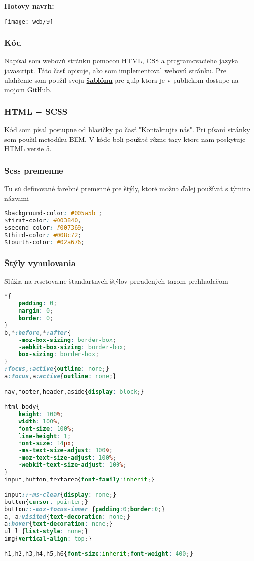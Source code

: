       \newpage

      \begin{center}
        \textbf{Hotovy navrh:}

        \texttt{[image: web/9]}
      \end{center}

      \subsubsection{Kód}
      Napísal som webovú stránku pomocou HTML, CSS a programovacieho jazyka javascript. Táto časť opisuje, ako som implementoval webovú stránku.
      Pre uľahčenie som použil svoju \textbf{\href{https://github.com/SerMeliodas/gulp-template}{šablónu}} pre gulp ktora je v publickom dostupe na mojom GitHub.

      \subsubsection*{HTML + SCSS}

      Kód som písal postupne od hlavičky po časť "Kontaktujte nás". Pri písaní stránky som použil metodiku BEM.
      V kóde boli použité rôzne tagy ktore nam poskytuje HTML versie 5.

      \subsubsection*{Scss premenne}
      Tu sú definované farebné premenné pre štýly, ktoré možno ďalej používať s týmito názvami
      \begin{lstlisting}[language=css]
$background-color: #005a5b ;
$first-color: #003840;
$second-color: #007369;
$third-color: #008c72;
$fourth-color: #02a676;
      \end{lstlisting}

      \subsubsection*{Štýly vynulovania}
      Slúžia na resetovanie štandartnych štýlov priradených tagom prehliadačom
\begin{lstlisting}[language=css]
*{
	padding: 0;
	margin: 0;
	border: 0;
}
b,*:before,*:after{
	-moz-box-sizing: border-box;
	-webkit-box-sizing: border-box;
	box-sizing: border-box;
}
:focus,:active{outline: none;}
a:focus,a:active{outline: none;}

nav,footer,header,aside{display: block;}

html,body{
	height: 100%;
	width: 100%;
	font-size: 100%;
	line-height: 1;
	font-size: 14px;
	-ms-text-size-adjust: 100%;
	-moz-text-size-adjust: 100%;
	-webkit-text-size-adjust: 100%;
}
input,button,textarea{font-family:inherit;}

input::-ms-clear{display: none;}
button{cursor: pointer;}
button::-moz-focus-inner {padding:0;border:0;}
a, a:visited{text-decoration: none;}
a:hover{text-decoration: none;}
ul li{list-style: none;}
img{vertical-align: top;}

h1,h2,h3,h4,h5,h6{font-size:inherit;font-weight: 400;}
\end{lstlisting}

